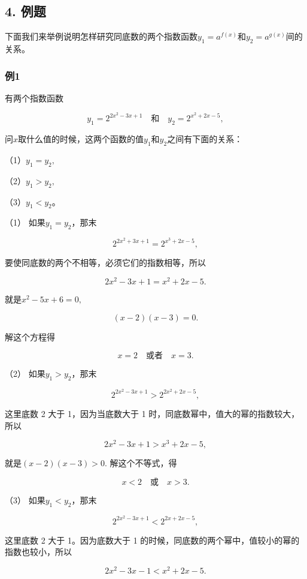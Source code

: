 \subsection{4. 例题}

下面我们来举例说明怎样研究同底数的两个指数函数\(y_{1} = a^{f(x)}\)和\(y_{2} = a^{g(x)}\)间的关系。

\subsubsection{例1}

有两个指数函数

\[
y_{1} = 2^{2 x^{2} - 3 x + 1} \quad \text{和} \quad y_{2} = 2^{x^{2} + 2 x - 5},
\]

问\(x\)取什么值的时候，这两个函数的值\(y_{1}\)和\(y_{2}\)之间有下面的关系：

（1）\(y_{1}=y_{2},\)

（2）\(y_{1}>y_{2},\)

（3）\(y_{1}<y_{2}\)。

 （1） 如果\(y_{1} = y_{2}\)，那末

\[
2^{2 x^{2} + 3 x + 1} = 2^{x^{3} + 2 x - 5},
\]

要使同底数的两个不相等，必须它们的指数相等，所以

\[
2 x^{2} - 3 x + 1 = x^{2} + 2 x - 5.
\]

就是\(x^{2} - 5x + 6 = 0,\)

\[
(x - 2) (x - 3) = 0.
\]

解这个方程得

\[
x=2\quad\text{或者}\quad x=3.
\]

（2） 如果\(y_{1} > y_{2}\)，那末

\[
2^{2 x^{2} - 3 x + 1} > 2^{2 x^{2} + 2 x - 5},
\]

这里底数 2 大于 1，因为当底数大于 1
时，同底数幂中，值大的幂的指数较大，所以

\[
2 x^{2} - 3 x + 1 > x^{3} + 2 x - 5,
\]

就是\((x - 2)(x - 3) > 0.\) 解这个不等式，得

\[
x < 2 \quad \text{或} \quad x > 3.
\]

（3） 如果\(y_{1}<y_{2}\)，那末

\[
2^{2 x^{2} - 3 x + 1} < 2^{2 x + 2 x - 5},
\]

这里底数 2 大于 1。因为底数大于 1
的时候，同底数的两个幂中，值较小的幂的指数也较小，所以

\[
2 x^{2} - 3 x - 1 < x^{2} + 2 x - 5.
\]

